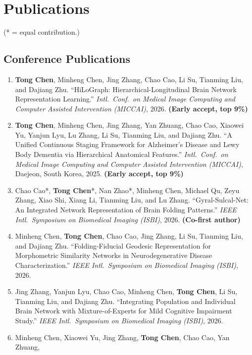 \section{Publications}
{\small (* = equal contribution.)}

\subsection*{Conference Publications}
\begin{enumerate}
  \item \textbf{Tong Chen}, Minheng Chen, Jing Zhang, Chao Cao, Li Su, Tianming Liu, and
        Dajiang Zhu. ``HiLoGraph: Hierarchical-Longitudinal Brain Network Representation
        Learning.'' \textit{Intl.\ Conf.\ on Medical Image Computing and Computer Assisted
        Intervention (MICCAI)}, 2026. \textbf{(Early accept, top 9\%)}
  \item \textbf{Tong Chen}, Minheng Chen, Jing Zhang, Yan Zhuang, Chao Cao, Xiaowei Yu,
        Yanjun Lyu, Lu Zhang, Li Su, Tianming Liu, and Dajiang Zhu. ``A Unified Continuous
        Staging Framework for Alzheimer's Disease and Lewy Body Dementia via Hierarchical
        Anatomical Features.'' \textit{Intl.\ Conf.\ on Medical Image Computing and Computer
        Assisted Intervention (MICCAI)}, Daejeon, South Korea, 2025. \textbf{(Early accept, top 9\%)}
  \item Chao Cao*, \textbf{Tong Chen}*, Nan Zhao*, Minheng Chen, Michael Qu, Zeyu Zhang,
        Xiao Shi, Xiang Li, Tianming Liu, and Lu Zhang. ``Gyral-Sulcal-Net: An Integrated
        Network Representation of Brain Folding Patterns.'' \textit{IEEE Intl.\ Symposium on
        Biomedical Imaging (ISBI)}, 2026. \textbf{(Co-first author)}
  \item Minheng Chen, \textbf{Tong Chen}, Chao Cao, Jing Zhang, Li Su, Tianming Liu, and
        Dajiang Zhu. ``Folding-Fiducial Geodesic Representation for Morphometric Similarity
        Networks in Neurodegenerative Disease Characterization.'' \textit{IEEE Intl.\
        Symposium on Biomedical Imaging (ISBI)}, 2026.
  \item Jing Zhang, Yanjun Lyu, Chao Cao, Minheng Chen, \textbf{Tong Chen}, Li Su,
        Tianming Liu, and Dajiang Zhu. ``Integrating Population and Individual Brain Network
        with Mixture-of-Experts for Mild Cognitive Impairment Study.'' \textit{IEEE Intl.\
        Symposium on Biomedical Imaging (ISBI)}, 2026.
  \item Minheng Chen, Xiaowei Yu, Jing Zhang, \textbf{Tong Chen}, Chao Cao, Yan Zhuang,

\end{enumerate}
